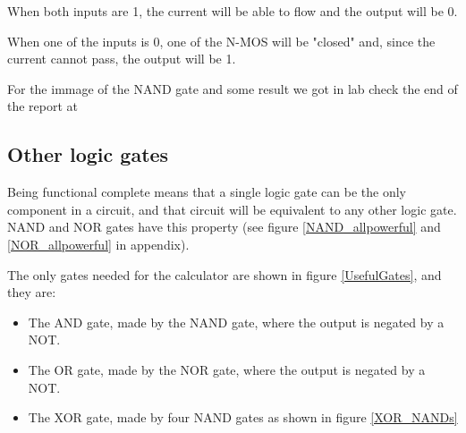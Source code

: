 \documentclass{article}
\begin{document}
\vspace{3mm}

When both inputs are 1, the current will be able to flow and the output will be 0.

\vspace{1mm}

When one of the inputs is 0, one of the N-MOS will be "closed" and, since the current cannot pass, the output will be 1.

\vspace{3mm}

For the immage of the NAND gate and some result we got in lab check the end of the report at %



\subsection{Other logic gates} \label{OtherGates}

Being functional complete means that a single logic gate can be the only component in a circuit, and that circuit will be equivalent to any other logic gate. NAND and NOR gates have this property (see figure \ref{NAND_allpowerful} and \ref{NOR_allpowerful} in appendix).

\vspace{3mm}

The only gates needed for the calculator are shown in figure \ref{UsefulGates}, and they are: 

\begin{itemize}
\item The AND gate, made by the NAND gate, where the output is negated by a NOT.
\item The OR gate, made by the NOR gate, where the output is negated by a NOT.
\item The XOR gate, made by four NAND gates as shown in figure \ref{XOR_NANDs}
\end{itemize}
\end{document}

